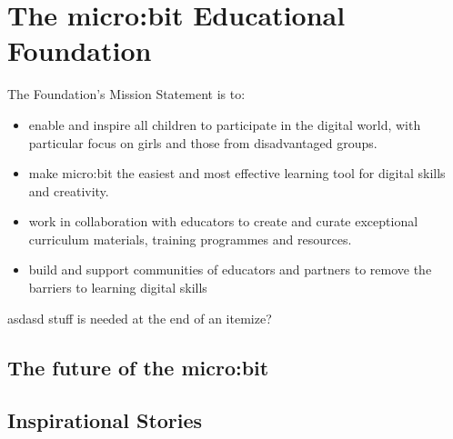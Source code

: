 \section{The micro:bit Educational Foundation}
\label{sec:mef}

The Foundation's Mission Statement is to:
\begin{itemize}
\item  enable and inspire all children to participate in the digital world,
with particular focus on girls and those from disadvantaged groups.
\item make micro:bit the easiest and most effective learning tool for digital skills and creativity.
\item work in collaboration with educators to create and curate exceptional
curriculum materials, training programmes and resources.
\item build and support communities of educators and partners
to remove the barriers to learning digital skills
\end{itemize}

asdasd stuff is needed at the end of an itemize?

\subsection{The future of the micro:bit}


\subsection{Inspirational Stories}





